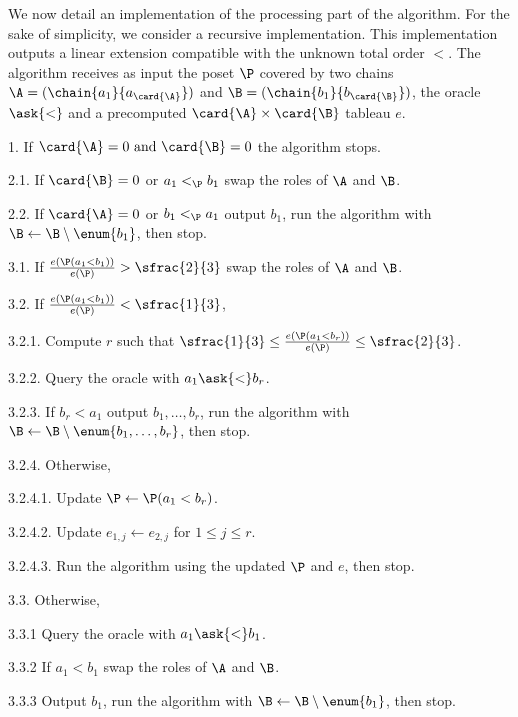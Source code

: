We now detail an implementation of the processing part of the algorithm. For the sake of simplicity,
we consider a recursive implementation. This implementation outputs a linear
extension compatible with the unknown total order \(<\). The algorithm receives as
input the poset \(\P\) covered by two chains \(\A =
(\chain{a_1}{a_{\card{\A}}})\) and \(\B = (\chain{b_1}{b_{\card{\B}}})\), the oracle
\(\ask{<}\) and a precomputed \(\card{\A} \times \card{\B}\) tableau \(e\).


\begin{algorithm}
\item[1.] If \(\card{\A} = 0 \text{ and } \card{\B} = 0\) the algorithm stops.
\item[2.1.] If \(\card{\B} = 0\) or \(a_1 <_{\P} b_1\) swap the roles of \(\A\) and \(\B\).
\item[2.2.] If \(\card{\A} = 0\) or \(b_1 <_{\P} a_1\) output
\(b_1\), run the
algorithm with \(\B \gets \B \setminus \enum{b_1}\), then stop.
\item[3.1.] If \(\frac{e(\P(a_1 < b_1))}{e(\P)} > \sfrac{2}{3}\) swap the
roles of \(\A\) and \(\B\).
\item[3.2.] If \(\frac{e(\P(a_1 < b_1))}{e(\P)} < \sfrac{1}{3}\),
\item[3.2.1.] Compute \(r\) such that \(\sfrac{1}{3} \le \frac{e(\P(a_1 < b_r))}{e(\P)} \le \sfrac{2}{3}\).
\item[3.2.2.] Query the oracle with \(a_1 \ask{<} b_r\).
\item[3.2.3.] If \(b_r < a_1\) output
\(b_1,\ldots,b_r\), run the algorithm with \(\B \gets \B
\setminus \enum{b_1,\ldots,b_r}\), then stop.
\item[3.2.4.] Otherwise,
\item[3.2.4.1.] Update \(\P \gets \P( a_1 < b_r )\).
\item[3.2.4.2.] Update \(e_{1,j} \gets e_{2,j}\) for \(1 \le j \le r\).
\item[3.2.4.3.] Run the algorithm using the updated \(\P\) and \(e\), then stop.
\item[3.3.] Otherwise,
\item[3.3.1] Query the oracle with \(a_1 \ask{<} b_1\).
\item[3.3.2] If \(a_1 < b_1\) swap the roles of \(\A\) and \(\B\).
\item[3.3.3] Output \(b_1\), run the algorithm with \(\B \gets \B \setminus
\enum{b_1}\), then stop.
\end{algorithm}

